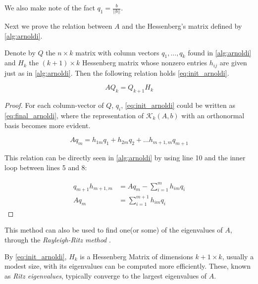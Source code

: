 We also make note of the fact $q_{1} = \frac{b}{||b||}$.

Next we prove the relation between $A$ and the Hessenberg's matrix defined by \ref{alg:arnoldi}.

\begin{proposition}

    Denote by $Q$ the $n \times k$ matrix with column vectors $q_{1}, \dots, q_{k}$ found in \ref{alg:arnoldi} and $H_{k}$ the $(k + 1)\times k$ Hessenberg matrix whose nonzero entries $h_{ij}$ are given just as in \ref{alg:arnoldi}. Then the following relation holds \ref{eq:init_arnoldi}.

    \begin{equation} \label{eq:init_arnoldi}
        AQ_{k} = Q_{k+1}H_{k}
    \end{equation}
\end{proposition}

\begin{proof}
    For each column-vector of $Q$, $q_{i}$, \ref{eq:init_arnoldi} could be written as \ref{eq:final_arnoldi}, where the representation of $\mathcal{K}_{k}(A,b)$ with an orthonormal basis becomes more evident.

    \begin{equation}\label{eq:final_arnoldi}
        Aq_{m} = h_{1m}q_{1} + h_{2m}q_{2} + \dots h_{m+1,m}q_{m+1}
    \end{equation}

    This relation can be directly seen in \ref{alg:arnoldi} by using line 10 and the inner loop between lines 5 and 8:

    \begin{align}
        \begin{split}
            q_{m+1}h_{m+1,m} & = Aq_{m} - \sum_{i=1}^{m} h_{im}q_{i}\\
            Aq_{m} & = \sum_{i=1}^{m+1} h_{im}q_{i}
        \end{split}
    \end{align}

\end{proof}

This method can also be used to find one(or some) of the eigenvalues of $A$, through the \textit{Rayleigh-Ritz method} \cite{trefethen1998numerical}.

By \ref{eq:init_arnoldi}, $H_{k}$ is a Hessenberg Matrix of dimensions $k+1 \times k$, usually a modest size, with its eigenvalues can be computed more efficiently. These, known as \textit{Ritz eigenvalues}, typically converge to the largest eigenvalues of $A$.
